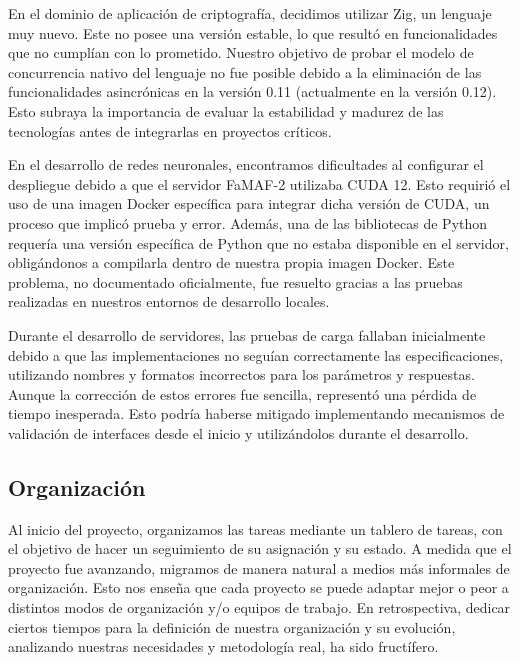 \documentclass[11pt]{article}
\let\Oldsubsection\subsection
\renewcommand{\subsection}{\FloatBarrier\Oldsubsection}
\begin{document}
En el dominio de aplicación de criptografía, decidimos utilizar Zig, un lenguaje muy nuevo. Este no posee una versión estable, lo que resultó en funcionalidades que no cumplían con lo prometido. Nuestro objetivo de probar el modelo de concurrencia nativo del lenguaje no fue posible debido a la eliminación de las funcionalidades asincrónicas en la versión 0.11 (actualmente en la versión 0.12). Esto subraya la importancia de evaluar la estabilidad y madurez de las tecnologías antes de integrarlas en proyectos críticos.

En el desarrollo de redes neuronales, encontramos dificultades al configurar el despliegue debido a que el servidor FaMAF-2 utilizaba CUDA 12. Esto requirió el uso de una imagen Docker específica para integrar dicha versión de CUDA, un proceso que implicó prueba y error. Además, una de las bibliotecas de Python requería una versión específica de Python que no estaba disponible en el servidor, obligándonos a compilarla dentro de nuestra propia imagen Docker. Este problema, no documentado oficialmente, fue resuelto gracias a las pruebas realizadas en nuestros entornos de desarrollo locales.

Durante el desarrollo de servidores, las pruebas de carga fallaban inicialmente debido a que las implementaciones no seguían correctamente las especificaciones, utilizando nombres y formatos incorrectos para los parámetros y respuestas. Aunque la corrección de estos errores fue sencilla, representó una pérdida de tiempo inesperada. Esto podría haberse mitigado implementando mecanismos de validación de interfaces desde el inicio y utilizándolos durante el desarrollo.

\subsection{Organización}

Al inicio del proyecto, organizamos las tareas mediante un tablero de tareas, con el objetivo de hacer un seguimiento de su asignación y su estado. A medida que el proyecto fue avanzando, migramos de manera natural a medios más informales de organización. Esto nos enseña que cada proyecto se puede adaptar mejor o peor a distintos modos de organización y/o equipos de trabajo. En retrospectiva, dedicar ciertos tiempos para la definición de nuestra organización y su evolución, analizando nuestras necesidades y metodología real, ha sido fructífero.
\end{document}
